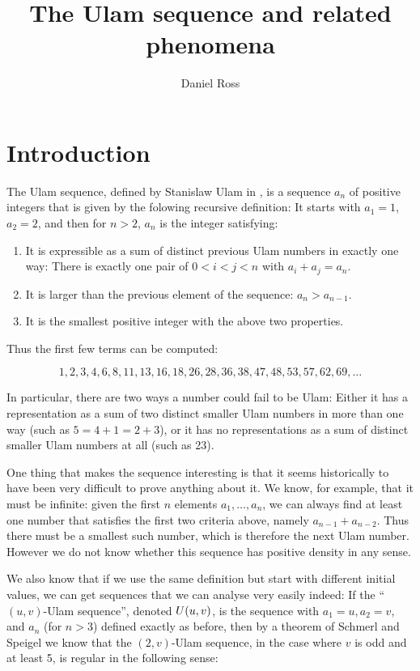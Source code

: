 \documentclass{report}
\title{The Ulam sequence and related phenomena}
\author{Daniel Ross}
\date{ }
\theoremstyle{remark}
\numberwithin{equation}{section}
\begin{document}
\maketitle

\tableofcontents


\chapter{Introduction}

The Ulam sequence, defined by Stanislaw Ulam in \cite{ulam:siam1964},
is a sequence $a_n$ of positive integers that is given by the folowing
recursive definition: It starts with $a_1 = 1$, $a_2 = 2$, and then
for $n > 2$, $a_n$ is the integer satisfying:
\begin{enumerate}
\item It is expressible as a sum of distinct previous Ulam numbers in
  exactly one way: There is exactly one pair of $0 < i < j < n$ with
  $a_i + a_j = a_n$.
\item It is larger than the previous element of the sequence: $a_n >
  a_{n-1}$.
\item It is the smallest positive integer with the above two
  properties.
\end{enumerate}

Thus the first few terms can be computed: 

\[1, 2, 3, 4, 6, 8, 11, 13, 16, 18, 26, 28, 36, 38, 47, 48, 53, 57, 62,
69, \ldots\]

In particular, there are two ways a number could fail to be Ulam:
Either it has a representation as a sum of two distinct smaller Ulam
numbers in more than one way (such as $5 = 4+1 = 2+3$), or it has no
representations as a sum of distinct smaller Ulam numbers at all (such
as 23).

One thing that makes the sequence interesting is that it seems
historically to have been very difficult to prove anything about it.
We know, for example, that it must be infinite: given the first $n$
elements $a_1, \ldots, a_n$, we can always find at least one number
that satisfies the first two criteria above, namely
$a_{n-1} + a_{n-2}$.  Thus there must be a smallest such number, which
is therefore the next Ulam number.  However we do not know whether
this sequence has positive density in any sense.

We also know that if we use the same definition but start with
different initial values, we can get sequences that we can analyse
very easily indeed: If the ``$(u,v)$-Ulam sequence'', denoted
$U(u,v)$, is the sequence with $a_1 = u, a_2 = v$, and $a_n$ (for
$n > 3$) defined exactly as before, then by a theorem of Schmerl and
Speigel \cite{schmerl:jct1994} we know that the $(2,v)$-Ulam sequence,
in the case where $v$ is odd and at least 5, is regular in the
following sense:
\end{document}
